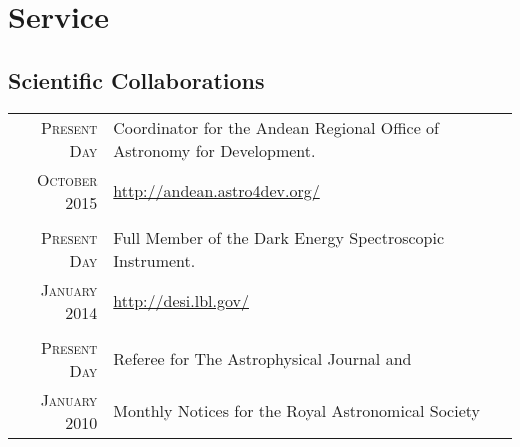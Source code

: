 \documentclass[a4paper,10pt]{article} %
\begin{document}



\color{red}
\section{Service}
\color{black}
\subsection{Scientific Collaborations}

\begin{tabular}{rl}	
 \textsc{Present Day} &  Coordinator for the Andean Regional Office of  Astronomy for Development.\\
 \textsc{October 2015} & \url{http://andean.astro4dev.org/}\\
& \\
 \textsc{Present Day} &  Full Member of the Dark Energy Spectroscopic Instrument.\\
 \textsc{January 2014} & \url{http://desi.lbl.gov/}\\
& \\ 
\textsc{Present Day} & Referee for The Astrophysical Journal and \\
\textsc{January 2010} & Monthly Notices for the Royal Astronomical
Society\\
\end{tabular}
\end{document}
